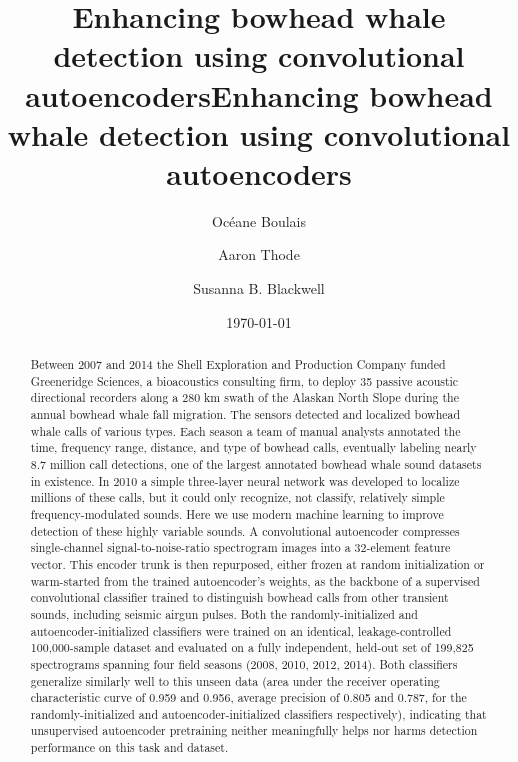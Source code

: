 \documentclass[preprint,NumberedRefs]{JASAnew}
\begin{document}
\title[JASA/Sample  JASA Article]{Enhancing bowhead whale detection using convolutional autoencoders}
\author{Océane Boulais}


\title[JASA/Sample  JASA Article]{Enhancing bowhead whale detection using convolutional autoencoders}
\author{Aaron Thode}


\author{Susanna B. Blackwell}


\date{\today} 

\begin{abstract}

Between 2007 and 2014 the Shell Exploration and Production Company funded Greeneridge Sciences, a bioacoustics consulting firm, to deploy 35 passive acoustic directional recorders along a 280 km swath of the Alaskan North Slope during the annual bowhead whale fall migration. The sensors detected and localized bowhead whale calls of various types. Each season a team of manual analysts annotated the time, frequency range, distance, and type of bowhead calls, eventually labeling nearly 8.7 million call detections, one of the largest annotated bowhead whale sound datasets in existence. In 2010 a simple three-layer neural network was developed to localize millions of these calls, but it could only recognize, not classify, relatively simple frequency-modulated sounds. Here we use modern machine learning to improve detection of these highly variable sounds. A convolutional autoencoder compresses single-channel signal-to-noise-ratio spectrogram images into a 32-element feature vector. This encoder trunk is then repurposed, either frozen at random initialization or warm-started from the trained autoencoder's weights, as the backbone of a supervised convolutional classifier trained to distinguish bowhead calls from other transient sounds, including seismic airgun pulses. Both the randomly-initialized and autoencoder-initialized classifiers were trained on an identical, leakage-controlled 100,000-sample dataset and evaluated on a fully independent, held-out set of 199,825 spectrograms spanning four field seasons (2008, 2010, 2012, 2014). Both classifiers generalize similarly well to this unseen data (area under the receiver operating characteristic curve of 0.959 and 0.956, average precision of 0.805 and 0.787, for the randomly-initialized and autoencoder-initialized classifiers respectively), indicating that unsupervised autoencoder pretraining neither meaningfully helps nor harms detection performance on this task and dataset.
\end{abstract}
\end{document}
